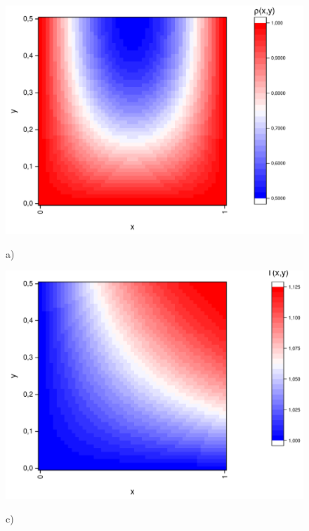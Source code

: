 \documentclass[a4paper,12pt]{article}
\begin{document}
\begin{figure}[h!]
	\begin{center}
		\begin{minipage}[h]{0.23\linewidth}
			\includegraphics[width=\textwidth]{graphs/graphs_l/ro.pdf} \begin{center}	a)	\end{center}
		\end{minipage}
		\begin{minipage}[h]{0.23\linewidth}
			\includegraphics[width=\textwidth]{graphs/graphs_l/T.pdf} \begin{center}	c)	\end{center}
		\end{minipage}

\end{center}
\end{figure}
\end{document}
